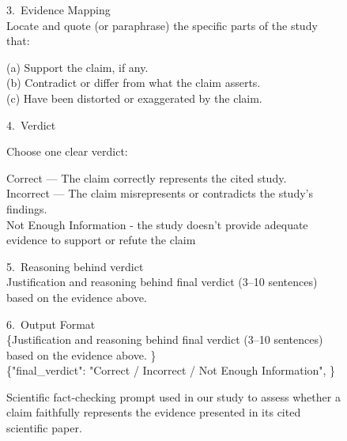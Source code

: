 \documentclass[11pt]{article}
\begin{document}
\begin{figure}[t]
{\begin{minipage}{0.97\textwidth}
\begin{flushleft}
3.\ Evidence Mapping \\
Locate and quote (or paraphrase) the specific parts of the study that:

\vspace{0.5em}

\hspace*{1.5em}(a) Support the claim, if any. \\
\hspace*{1.5em}(b) Contradict or differ from what the claim asserts. \\
\hspace*{1.5em}(c) Have been distorted or exaggerated by the claim.

\vspace{0.5em}

4.\ Verdict

\vspace{0.5em}

Choose one clear verdict:

\vspace{0.5em}

\hspace*{1.5em}Correct --- The claim correctly represents the cited study. \\
\hspace*{1.5em}Incorrect  --- The claim misrepresents or contradicts the study’s findings. \\
\hspace*{1.5em}Not Enough Information - the study doesn’t provide adequate evidence to support or refute the claim

\vspace{0.5em}

5.\ Reasoning behind verdict \\
Justification and reasoning behind final verdict (3--10 sentences) based on the evidence above.

\vspace{0.5em}

6.\ Output Format \\
\{Justification and reasoning behind final verdict (3--10 sentences) based on the evidence above. \} \\
\{"final\_verdict": "Correct /  Incorrect  / Not Enough Information", \}
\end{flushleft}
\end{minipage}%
}
\caption{Scientific fact-checking prompt used in our study to assess whether a claim faithfully represents the evidence presented in its cited scientific paper.}
\label{fig:factcheck-prompt}
\end{figure}
\end{document}
